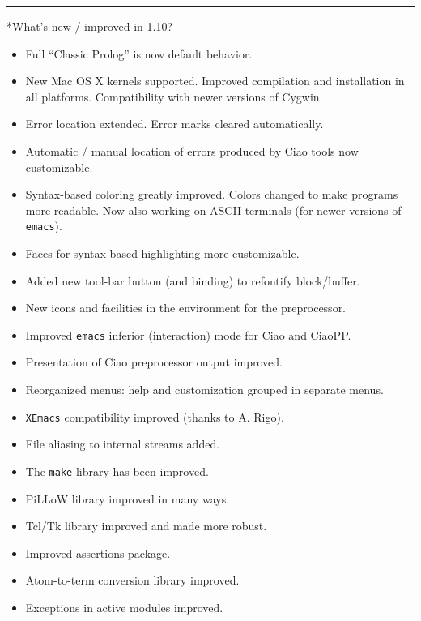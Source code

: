 \documentclass{article}
\makeatletter
\def\subsection{\@startsection{subsection}{2}{\z@}{-1.0ex plus -1ex minus 
 -.2ex}{0.7ex plus .2ex}{\normalsize\bf}}
\renewcommand{\baselinestretch}{0.95}
\newcommand{\myitems}{
\renewcommand{\baselinestretch}{0.5}
\parsep 0pt \parindent 0pt \itemsep -4pt \topsep -3pt }
\makeatother
\begin{document}
\hrule

\subsection*{What's new / improved in 1.10?}
\begin{itemize}
\myitems
\item Full ``Classic Prolog'' is now default behavior.
\item New Mac OS X kernels supported. Improved compilation and
  installation in all platforms. Compatibility with newer versions of
  Cygwin. 
\item Error location extended. Error marks cleared automatically. %
\item Automatic / manual location of errors produced by Ciao
  tools now customizable.
\item Syntax-based coloring greatly improved.  Colors changed to make
  programs more readable. Now also working on ASCII terminals (for
  newer versions of \texttt{emacs}).
\item Faces for syntax-based highlighting more customizable.
\item Added new tool-bar button (and binding) to refontify
  block/buffer.
\item New icons and facilities in the environment for the
  preprocessor.
\item Improved \texttt{emacs} inferior (interaction) mode for Ciao and CiaoPP.
\item Presentation of Ciao preprocessor output improved.
\item Reorganized menus: help and customization grouped in separate
  menus.
\item \texttt{XEmacs} compatibility improved (thanks to A. Rigo).
\item File aliasing to internal streams added.
\item The \texttt{make} library has been improved.
\item PiLLoW library improved in many ways.
\item Tcl/Tk library improved and made more robust.
\item Improved assertions package.
\item Atom-to-term conversion library improved.
\item Exceptions in active modules improved.

\end{itemize}
\end{document}
